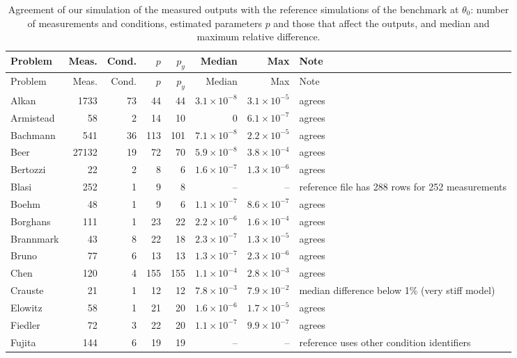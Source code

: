 {\small
\begin{longtable}{@{}>{\raggedright\arraybackslash}p{2.6cm}rrrrrr>{\raggedright\arraybackslash}p{5.3cm}@{}}
\caption{Agreement of our simulation of the measured outputs with the reference simulations of the benchmark at $\theta_0$: number of measurements and conditions, estimated parameters $p$ and those that affect the outputs, and median and maximum relative difference.}\label{tab:simulator}\\
\toprule Problem & Meas. & Cond. & $p$ & $p_y$ & Median & Max & Note \\ \midrule \endfirsthead
\toprule Problem & Meas. & Cond. & $p$ & $p_y$ & Median & Max & Note \\ \midrule \endhead
Alkan & 1733 & 73 & 44 & 44 & $3.1\times10^{-8}$ & $3.1\times10^{-5}$ & agrees \\
Armistead & 58 & 2 & 14 & 10 & $0$ & $6.1\times10^{-7}$ & agrees \\
Bachmann & 541 & 36 & 113 & 101 & $7.1\times10^{-8}$ & $2.2\times10^{-5}$ & agrees \\
Beer & 27132 & 19 & 72 & 70 & $5.9\times10^{-8}$ & $3.8\times10^{-4}$ & agrees \\
Bertozzi & 22 & 2 & 8 & 6 & $1.6\times10^{-7}$ & $1.3\times10^{-6}$ & agrees \\
Blasi & 252 & 1 & 9 & 8 & -- & -- & reference file has 288 rows for 252 measurements \\
Boehm & 48 & 1 & 9 & 6 & $1.1\times10^{-7}$ & $8.6\times10^{-7}$ & agrees \\
Borghans & 111 & 1 & 23 & 22 & $2.2\times10^{-6}$ & $1.6\times10^{-4}$ & agrees \\
Brannmark & 43 & 8 & 22 & 18 & $2.3\times10^{-7}$ & $1.3\times10^{-5}$ & agrees \\
Bruno & 77 & 6 & 13 & 13 & $1.3\times10^{-7}$ & $2.3\times10^{-6}$ & agrees \\
Chen & 120 & 4 & 155 & 155 & $1.1\times10^{-4}$ & $2.8\times10^{-3}$ & agrees \\
Crauste & 21 & 1 & 12 & 12 & $7.8\times10^{-3}$ & $7.9\times10^{-2}$ & median difference below 1\% (very stiff model) \\
Elowitz & 58 & 1 & 21 & 20 & $1.6\times10^{-6}$ & $1.7\times10^{-5}$ & agrees \\
Fiedler & 72 & 3 & 22 & 20 & $1.1\times10^{-7}$ & $9.9\times10^{-7}$ & agrees \\
Fujita & 144 & 6 & 19 & 19 & -- & -- & reference uses other condition identifiers \\

\end{longtable}}
